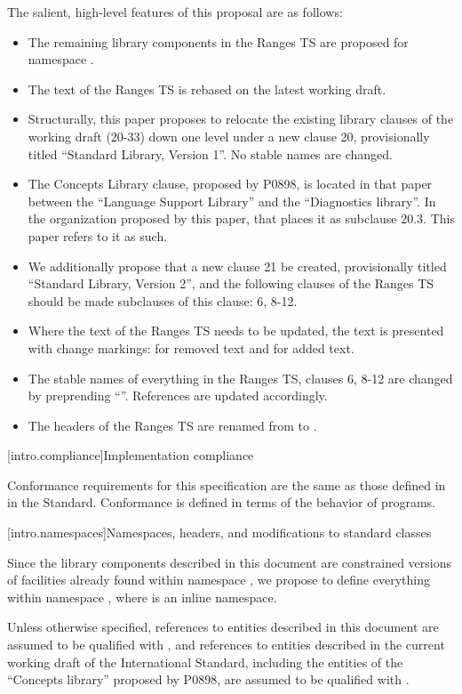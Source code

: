 \pnum
The salient, high-level features of this proposal are as follows:

\begin{itemize}
\item The remaining library components in the Ranges TS are proposed for
namespace .

\item The text of the Ranges TS is rebased on the latest working draft.

\item Structurally, this paper proposes to relocate the existing library clauses
of the working draft (20-33) down one level under a new clause 20, provisionally
titled ``Standard Library, Version 1''. No stable names are changed.

\item The Concepts Library clause, proposed by P0898, is located in that paper
between the ``Language Support Library'' and the ``Diagnostics library''. In the
organization proposed by this paper, that places it as subclause 20.3. This paper
refers to it as such.

\item We additionally propose that a new clause 21 be created, provisionally
titled ``Standard Library, Version 2'', and the following clauses of the Ranges
TS should be made subclauses of this clause: 6, 8-12.

\item Where the text of the Ranges TS needs to be updated, the text is presented
with change markings:  for removed text and
 for added text.

\item The stable names of everything in the Ranges TS, clauses 6, 8-12 are
changed by preprending ``''. References are updated accordingly.

\item The headers of the Ranges TS are renamed from
 to .
\end{itemize}

[intro.compliance]{Implementation compliance}

\pnum
Conformance requirements for this specification are the same as those
defined in  in the \Cpp Standard.
\enternote
Conformance is defined in terms of the behavior of programs.
\exitnote

[intro.namespaces]{Namespaces, headers, and modifications to standard classes}

\pnum
Since the library components described in this document are constrained versions
of facilities already found within namespace , we propose to define
everything within namespace , where  is an inline
namespace.

\pnum
Unless otherwise specified, references to entities described in this
document are assumed to be qualified with , and
references to entities described in the current working draft of the
International Standard, including the entities of the ``Concepts library''
proposed by P0898, are assumed to be qualified with .
